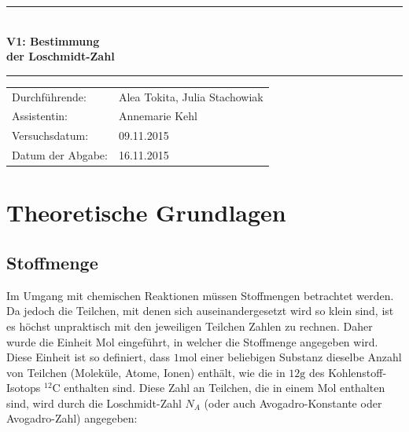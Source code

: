 \documentclass[12pt,a4paper,titlepage,headinclude,bibtotoc]{scrartcl}
\begin{document}
\begin{titlepage}
\centering

\vspace*{3cm}

\rule{\textwidth}{1pt}\\[0.5cm]
{\huge \bfseries
  V1: Bestimmung\\[1.5ex]
  der Loschmidt-Zahl}\\[0.5cm]
\rule{\textwidth}{1pt}

\vspace*{3cm}


\begin{Large}
\begin{tabular}{ll}
Durchführende: &  Alea Tokita, Julia Stachowiak\\
Assistentin: & Annemarie Kehl\\
 Versuchsdatum: & 09.11.2015\\
 Datum der Abgabe: & 16.11.2015\\
\end{tabular}
\end{Large}

\vspace*{2.5cm}

\begin{Large}
\end{Large}

\end{titlepage}

\tableofcontents

\newpage

\section{Theoretische Grundlagen}
\subsection{Stoffmenge}
Im Umgang mit chemischen Reaktionen müssen Stoffmengen betrachtet werden. Da jedoch die Teilchen, mit denen sich auseinandergesetzt wird so klein sind, ist es höchst unpraktisch mit den jeweiligen Teilchen Zahlen zu rechnen. Daher wurde die Einheit Mol eingeführt, in welcher die Stoffmenge angegeben wird. Diese Einheit ist so definiert, dass $ \mathrm{1 mol}$ einer beliebigen Substanz dieselbe Anzahl von Teilchen (Moleküle, Atome, Ionen) enthält, wie die in $\mathrm{12g}$ des Kohlenstoff-Isotops $\mathrm{^{12}C}$ enthalten sind. Diese Zahl an Teilchen, die in einem Mol enthalten sind, wird durch die Loschmidt-Zahl $N_{A}$ (oder auch Avogadro-Konstante oder Avogadro-Zahl) angegeben:\\
\end{document}
